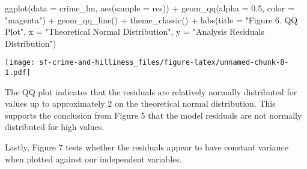 \documentclass[
]{article}
\newenvironment{Shaded}{\begin{snugshade}}{\end{snugshade}}
\newcommand{\AttributeTok}[1]{\textcolor[rgb]{0.77,0.63,0.00}{#1}}
\newcommand{\FloatTok}[1]{\textcolor[rgb]{0.00,0.00,0.81}{#1}}
\newcommand{\FunctionTok}[1]{\textcolor[rgb]{0.00,0.00,0.00}{#1}}
\newcommand{\NormalTok}[1]{#1}
\newcommand{\SpecialCharTok}[1]{\textcolor[rgb]{0.00,0.00,0.00}{#1}}
\newcommand{\StringTok}[1]{\textcolor[rgb]{0.31,0.60,0.02}{#1}}
\begin{document}
\begin{Shaded}
\begin{Highlighting}[]
\FunctionTok{ggplot}\NormalTok{(}\AttributeTok{data =}\NormalTok{ crime\_lm, }\FunctionTok{aes}\NormalTok{(}\AttributeTok{sample =}\NormalTok{ res)) }\SpecialCharTok{+}
  \FunctionTok{geom\_qq}\NormalTok{(}\AttributeTok{alpha =} \FloatTok{0.5}\NormalTok{, }\AttributeTok{color =} \StringTok{"magenta"}\NormalTok{) }\SpecialCharTok{+}
  \FunctionTok{geom\_qq\_line}\NormalTok{() }\SpecialCharTok{+}
  \FunctionTok{theme\_classic}\NormalTok{() }\SpecialCharTok{+}
  \FunctionTok{labs}\NormalTok{(}\AttributeTok{title =} \StringTok{"Figure 6. QQ Plot"}\NormalTok{,}
       \AttributeTok{x =} \StringTok{"Theoretical Normal Distribution"}\NormalTok{,}
       \AttributeTok{y =} \StringTok{"Analysis Residuals Distribution"}\NormalTok{)}
\end{Highlighting}
\end{Shaded}

\texttt{[image: sf-crime-and-hilliness\_files/figure-latex/unnamed-chunk-8-1.pdf]}

The QQ plot indicates that the residuals are relatively normally
distributed for values up to approximately 2 on the theoretical normal
distribution. This supports the conclusion from Figure 5 that the model
residuals are not normally distributed for high values.

Lastly, Figure 7 tests whether the residuals appear to have constant
variance when plotted against our independent variables.
\end{document}
